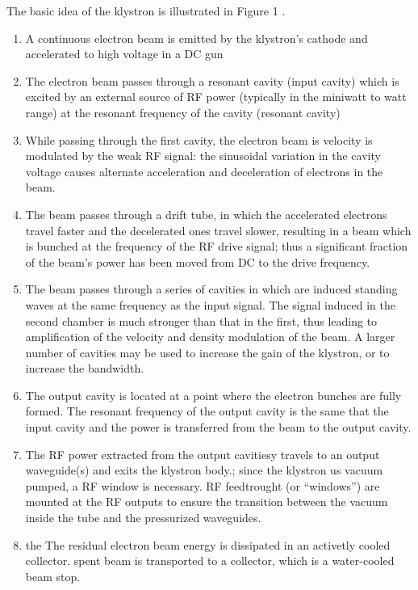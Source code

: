 The basic idea of the klystron is illustrated in Figure 1 \cite{Tenenbaum2003}.

\begin{enumerate}
 \item  A continuous electron beam is emitted by the klystron's cathode and accelerated to high voltage in a DC gun 
 \item The electron beam passes through a resonant cavity (input cavity) which is excited by an external source of RF power (typically in the miniwatt to watt range) at the resonant frequency of the cavity (resonant cavity) 
\item While passing through the first cavity, the electron beam is velocity is modulated by the weak RF signal: the sinusoidal variation in the cavity voltage causes alternate acceleration and deceleration of electrons in the beam. 
\item The beam passes through a drift tube, in which the accelerated electrons travel faster and the decelerated ones travel slower, resulting in a beam which is bunched at the frequency of the RF drive signal; thus a significant fraction of the beam’s power has been moved from DC to the drive frequency. 
\item The beam passes through a series of cavities in which are induced standing waves at the same frequency as the input signal. The signal induced in the second chamber is much stronger than that in the first, thus leading to amplification of the velocity and density modulation of the beam. A larger number of cavities may be used to increase the gain of the klystron, or to increase the bandwidth. 
\item The output cavity is located at a point where the electron bunches are fully formed. The resonant frequency of the output cavity is the same that the input cavity and the power is transferred from the beam to the output cavity. 
\item The RF power extracted from the output cavitiesy travels to an output waveguide(s) and exits the klystron body.;  since the klystron us vacuum pumped, a RF window is necessary. RF feedtrought (or “windows”) are mounted at the RF outputs to ensure the transition between the vacuum inside the tube and the pressurized waveguides.
\item the The residual electron beam energy is dissipated in an activetly cooled collector. spent beam is transported to a collector, which is a water-cooled beam stop. 
\end{enumerate}

